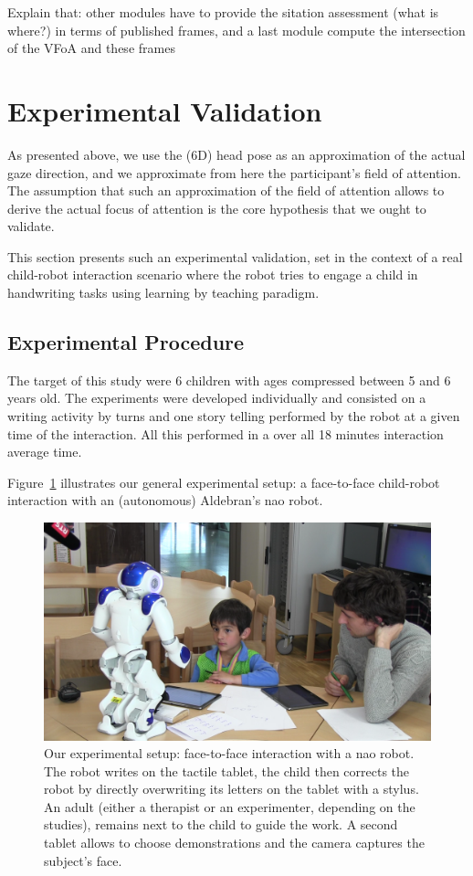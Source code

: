 \documentclass{sig-alternate}
\begin{document}
Explain that: other modules have to provide the sitation assessment (what
is where?) in terms of published frames, and a last module compute the
intersection of the VFoA and these frames

\section{Experimental Validation}

As presented above, we use the (6D) head pose as an approximation of the
actual gaze direction, and we approximate from here the participant's field of
attention. The assumption that such an approximation of the field of attention
allows to derive the actual focus of attention is the core hypothesis that we
ought to validate.

This section presents such an experimental validation, set in the context of a
real child-robot interaction scenario where the robot tries to engage a child in
handwriting tasks using learning by teaching paradigm.

\subsection{Experimental Procedure}

The target of this study were 6 children with ages compressed between 5 and 6
years old. The experiments were developed individually and consisted on a
writing activity by turns and one story telling performed by the robot at a
given time of the interaction. All this performed in a over all 18 minutes
interaction average time.

Figure~\ref{fig:realSetup} illustrates our general experimental setup: a
face-to-face child-robot interaction with an (autonomous) Aldebran's {\sc nao}
robot.

\begin{figure}[h!]
    \centering
    \includegraphics[width=1\columnwidth]{realSetup}
    \caption{\small Our experimental setup: face-to-face interaction with a {\sc
            nao} robot.  The robot writes on the tactile tablet, the child then
            corrects the robot by directly overwriting its letters on the tablet
            with a stylus. An adult (either a therapist or an experimenter,
            depending on the studies), remains next to the child to guide the work. 
            A second tablet allows to choose demonstrations and the camera captures the subject's face.}
    \label{fig:realSetup}
\end{figure}
\end{document}
